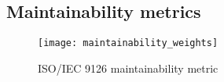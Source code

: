 \documentclass[twoside]{uva-inf-bachelor-thesis}
\begin{document}



\begin{appendices}
\chapter{Maintainability metrics}
\label{appendix:maintainability_metrics}
\begin{figure}[H]
    \label{figure:maintainability_weights}
    \caption{ISO/IEC 9126 maintainability metric}
    \centering
        \texttt{[image: maintainability\_weights]}
\end{figure}

\end{appendices}
\end{document}
